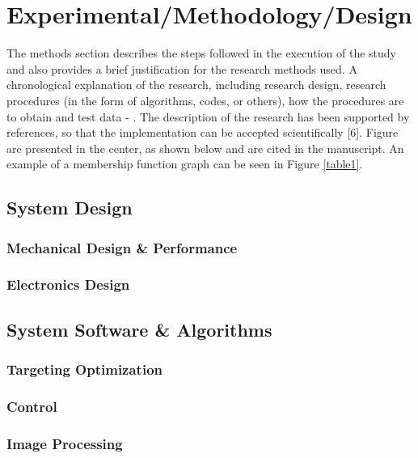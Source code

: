 \documentclass[twocolumn]{article}
\begin{document}
\section{Experimental/Methodology/Design}
The methods section describes the steps followed in the execution of the study and also provides a brief justification for the research methods used. A chronological explanation of the research, including research design, research procedures (in the form of algorithms, codes, or others), how the procedures are to obtain and test data \cite{Lo} - \cite{Hang}. The description of the research has been supported by references, so that the implementation can be accepted scientifically [6]. Figure are presented in the center, as shown below and are cited in the manuscript. An example of a membership function graph can be seen in Figure \ref{table1}.


\subsection{System Design}
\subsubsection{Mechanical Design \& Performance }
\subsubsection{Electronics Design}
\subsection{System Software \& Algorithms}
\subsubsection{Targeting Optimization}
\subsubsection{Control}
\subsubsection{Image Processing}



\end{document}

